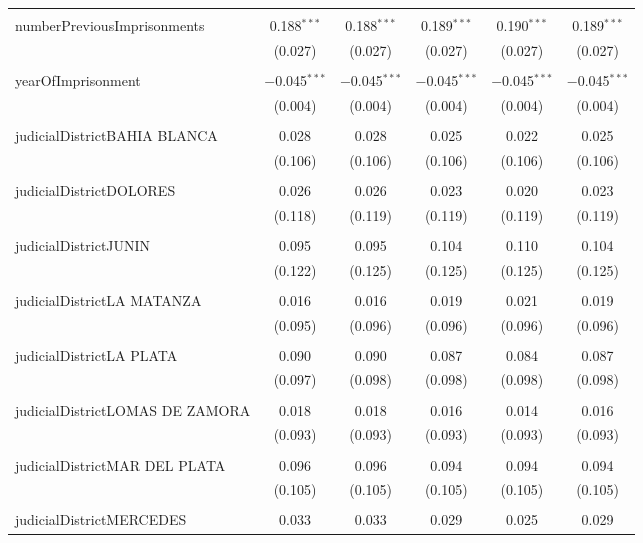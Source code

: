 \documentclass{article}
\begin{document}
\begin{table}[!htbp]
{\begin{tabular}{@{\extracolsep{5pt}}lccccc}
  & & & & & \\ 
 numberPreviousImprisonments & 0.188$^{***}$ & 0.188$^{***}$ & 0.189$^{***}$ & 0.190$^{***}$ & 0.189$^{***}$ \\ 
  & (0.027) & (0.027) & (0.027) & (0.027) & (0.027) \\ 
  & & & & & \\ 
 yearOfImprisonment & $-$0.045$^{***}$ & $-$0.045$^{***}$ & $-$0.045$^{***}$ & $-$0.045$^{***}$ & $-$0.045$^{***}$ \\ 
  & (0.004) & (0.004) & (0.004) & (0.004) & (0.004) \\ 
  & & & & & \\ 
 judicialDistrictBAHIA BLANCA & 0.028 & 0.028 & 0.025 & 0.022 & 0.025 \\ 
  & (0.106) & (0.106) & (0.106) & (0.106) & (0.106) \\ 
  & & & & & \\ 
 judicialDistrictDOLORES & 0.026 & 0.026 & 0.023 & 0.020 & 0.023 \\ 
  & (0.118) & (0.119) & (0.119) & (0.119) & (0.119) \\ 
  & & & & & \\ 
 judicialDistrictJUNIN & 0.095 & 0.095 & 0.104 & 0.110 & 0.104 \\ 
  & (0.122) & (0.125) & (0.125) & (0.125) & (0.125) \\ 
  & & & & & \\ 
 judicialDistrictLA MATANZA & 0.016 & 0.016 & 0.019 & 0.021 & 0.019 \\ 
  & (0.095) & (0.096) & (0.096) & (0.096) & (0.096) \\ 
  & & & & & \\ 
 judicialDistrictLA PLATA & 0.090 & 0.090 & 0.087 & 0.084 & 0.087 \\ 
  & (0.097) & (0.098) & (0.098) & (0.098) & (0.098) \\ 
  & & & & & \\ 
 judicialDistrictLOMAS DE ZAMORA & 0.018 & 0.018 & 0.016 & 0.014 & 0.016 \\ 
  & (0.093) & (0.093) & (0.093) & (0.093) & (0.093) \\ 
  & & & & & \\ 
 judicialDistrictMAR DEL PLATA & 0.096 & 0.096 & 0.094 & 0.094 & 0.094 \\ 
  & (0.105) & (0.105) & (0.105) & (0.105) & (0.105) \\ 
  & & & & & \\ 
 judicialDistrictMERCEDES & 0.033 & 0.033 & 0.029 & 0.025 & 0.029 \\ 

\end{tabular}}
\end{table}
\end{document}
